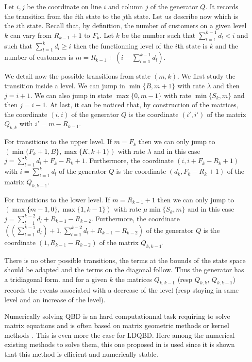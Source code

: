 \documentclass[conference]{IEEEtran}
\begin{document}
\begin{IEEEproof}
Let $i,j$ be the coordinate on line $i$ and column $j$ of the generator $Q$. It records the transition
from the $i$th state to the $j$th state.
Let us describe now which is the $i$th state. Recall that, by definition, the number of customers on a given level
$k$ can vary from $R_{k-1}+1$ to $F_k$. Let $k$ be the number such that
$\sum_{l=1}^{k-1} d_l <i$ and such that $\sum_{l=1}^{k} d_l  \geq i$ then the functionning level of the $i$th state is
$k$ and the number of customers is $m=R_{k-1}+\left(i-\sum_{l=1}^{k-1} d_l\right)$.

We detail now the possible transitions from state $(m,k)$.
We first study the transition inside a level. We can jump in $\min\{B,m+1\}$ with rate $\lambda$ and then $j=i+1$.
We can also jump in state $\max\{0,m-1\}$ with rate $\min\{S_k,m\}$ and then $j=i-1$.
At last, it can be noticed that, by construction of the matrices, the coordinate $(i,i)$ of the generator $Q$
is the coordinate $(i',i')$ of the matrix $Q_{k,k}$ with $i'=m-R_{k-1}$.

For transitions to the upper level. If $m=F_k$ then
we can only jump to $(\min\{F_k+1,B\},\max\{K,k+1\})$ with rate $\lambda$ and
in this case $j=\sum_{l=1}^{k} d_l + F_k-R_{k}+1$.
Furthermore, the coordinate $(i,i+F_k-R_{k}+1)$ with $i=\sum_{l=1}^{k} d_l$ of the generator $Q$
is the coordinate $(d_k,F_k-R_{k}+1)$ of the matrix $Q_{k,k+1}$.

For transitions to the lower level. If $m=R_{k-1}+1$ then
we can only jump to $(\max\{m-1,0\},\max\{1,k-1\})$ with rate $\mu \min\{S_k,m\}$
and in this case $j=\sum_{l=1}^{k-2} d_l + R_{k-1} - R_{k-2}$.
Furthermore, the coordinate $((\sum_{l=1}^{k-1} d_l)+1,\sum_{l=1}^{k-2} d_l + R_{k-1} - R_{k-2})$
of the generator $Q$ is the coordinate $(1,R_{k-1} - R_{k-2})$ of the matrix $Q_{k,k-1}$.

There is no other possible transitions, the terms at the bounds of the state space should be adapted and
the terms on the diagonal follow. Thus the generator has a tridiagonal form.
and for a given $k$ the matrices $Q_{k,k-1}$ (resp $Q_{k,k}$, $Q_{k,k+1}$)
records the events associated with a decrease of the level (resp staying in same level and an increase of the level).
\end{IEEEproof}

Numerically solving QBD is an hard computationnal task requiring to solve
matrix equations and is often based on matrix geometric methods
\cite{Neuts1981,art:latoucherama} or kernel methods \cite{gaujal2006optimal}.
This is even more the case for LDQBD.
Here among the numerical existing methods to solve them, this one proposed in  \cite{baumann2010numerical}
is used since it is shown that this method is efficient and numerically stable.
\end{document}
